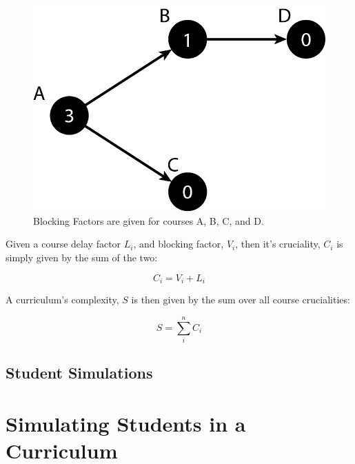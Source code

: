 \documentclass[botnum, fleqn]{unmeethesis}
\begin{document}
    \begin{figure}[h!]
      \centerline{\includegraphics[scale=0.4]{./figures/blocking_factor.png}}
      \caption{Blocking Factors are given for courses A, B, C, and D.} 
      \label{fig:blocking_factor_example}
    \end{figure}

    Given a course delay factor \(L_i\), and blocking factor, \(V_i\), then it's cruciality, \(C_i\) is simply given by the sum of the two:

    \begin{equation}
      C_{i} = V_{i} + L_{i}
    \end{equation}

    A curriculum's complexity, \(S\) is then given by the sum over all course crucialities:

    \begin{equation}
      S = \sum_{i}^n C_{i}
    \end{equation}


  \section{Student Simulations}
  


\chapter{Simulating Students in a Curriculum}
\end{document}
